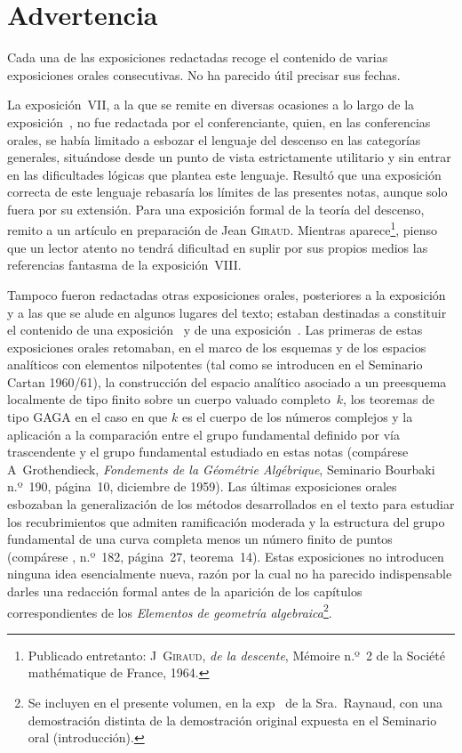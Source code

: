 \cleardoublepage
\chapter*{Advertencia}
\thispagestyle{empty}
\label{I.avertissement}

Cada una de las exposiciones redactadas recoge el contenido de varias exposiciones orales consecutivas. No ha parecido útil precisar sus fechas.

La exposición~VII, a la que se remite en diversas ocasiones a lo largo de la exposición~, no fue redactada por el conferenciante, quien, en las conferencias orales, se había limitado a esbozar el lenguaje del descenso en las categorías generales, situándose desde un punto de vista estrictamente utilitario y sin entrar en las dificultades lógicas que plantea este lenguaje. Resultó que una exposición correcta de este lenguaje rebasaría los límites de las presentes notas, aunque solo fuera por su extensión. Para una exposición formal de la teoría del descenso, remito a un artículo en preparación de Jean \textsc{Giraud}. Mientras aparece\footnote{Publicado entretanto: J\ptbl\ \textsc{Giraud}, \emph{ de la descente}, Mémoire n.º~2 de la Société mathématique de France, 1964.\label{footnotegiraud}}, pienso que un lector atento no tendrá dificultad en suplir por sus propios medios las referencias fantasma de la exposición~VIII.

Tampoco fueron redactadas otras exposiciones orales, posteriores a la exposición~ y a las que se alude en algunos lugares del texto; estaban destinadas a constituir el contenido de una exposición~ y de una exposición~. Las primeras de estas exposiciones orales retomaban, en el marco de los esquemas y de los espacios analíticos con elementos nilpotentes (tal como se introducen en el Seminario Cartan 1960/61), la construcción del espacio analítico asociado a un preesquema localmente de tipo finito sobre un cuerpo valuado completo~$k$, los teoremas de tipo GAGA en el caso en que $k$ es el cuerpo de los números complejos y la aplicación a la comparación entre el grupo fundamental definido por vía trascendente y el grupo fundamental estudiado en estas notas (compárese A\ptbl\ Grothendieck, \emph{Fondements de la Géométrie Algébrique}, Seminario Bourbaki n.º~190, página~10, diciembre de 1959). Las últimas exposiciones orales esbozaban la generalización de los métodos desarrollados en el texto para estudiar los recubrimientos que admiten ramificación moderada y la estructura del grupo fundamental de una curva completa menos un número finito de puntos (compárese \loccit, n.º~182, página~27, teorema~14). Estas exposiciones no introducen ninguna idea esencialmente nueva, razón por la cual no ha parecido indispensable darles una redacción formal antes de la aparición de los capítulos correspondientes de los \emph{Elementos de geometría algebraica}\footnote{Se incluyen en el presente volumen, en la exp\ptbl\  de la Sra.~Raynaud, con una demostración distinta de la demostración original expuesta en el Seminario oral (\cf introducción).}.

